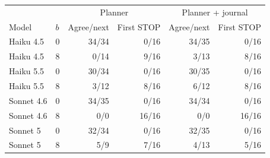 \begin{tabular}{llrrrr}
\toprule
& & \multicolumn{2}{c}{Planner} & \multicolumn{2}{c}{Planner + journal} \\
Model & $b$ & Agree/next & First STOP & Agree/next & First STOP \\
\midrule
Haiku 4.5 & 0 & 34/34 & 0/16 & 34/35 & 0/16 \\
Haiku 4.5 & 8 & 0/14 & 9/16 & 3/13 & 8/16 \\
Haiku 5.5 & 0 & 30/34 & 0/16 & 30/35 & 0/16 \\
Haiku 5.5 & 8 & 3/12 & 8/16 & 6/12 & 8/16 \\
Sonnet 4.6 & 0 & 34/35 & 0/16 & 34/34 & 0/16 \\
Sonnet 4.6 & 8 & 0/0 & 16/16 & 0/0 & 16/16 \\
Sonnet 5 & 0 & 32/34 & 0/16 & 32/35 & 0/16 \\
Sonnet 5 & 8 & 5/9 & 7/16 & 4/13 & 5/16 \\
\bottomrule
\end{tabular}

